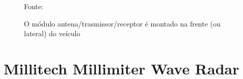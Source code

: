 \documentclass[xcolor=dvipsnames, aspectratio=169]{beamer}
\begin{document}
\begin{frame}
\begin{itemize}
        \begin{figure}
            \centering
            {Fonte: \cite{everett1995sensors}}
            \caption{O módulo antena/trasmissor/receptor é montado na frente (ou lateral) do veículo}
            \label{fig:curva_de_freq}
        \end{figure}
	\end{itemize}
\end{frame}


\section[Millitech Millimiter Wave Radar]{Millitech Millimiter Wave Radar} 
\end{document}
